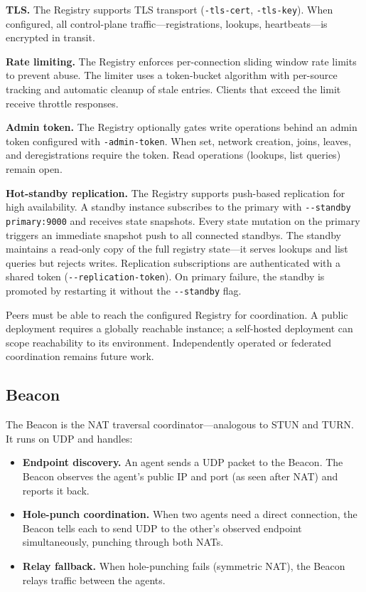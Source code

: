 \documentclass[11pt,a4paper]{article}
\begin{document}
\textbf{TLS.} The Registry supports TLS transport (\texttt{-tls-cert}, \texttt{-tls-key}). When configured, all control-plane traffic---registrations, lookups, heartbeats---is encrypted in transit.

\textbf{Rate limiting.} The Registry enforces per-connection sliding window rate limits to prevent abuse. The limiter uses a token-bucket algorithm with per-source tracking and automatic cleanup of stale entries. Clients that exceed the limit receive throttle responses.

\textbf{Admin token.} The Registry optionally gates write operations behind an admin token configured with \texttt{-admin-token}. When set, network creation, joins, leaves, and deregistrations require the token. Read operations (lookups, list queries) remain open.

\textbf{Hot-standby replication.} The Registry supports push-based replication for high availability. A standby instance subscribes to the primary with \texttt{-{}-standby primary:9000} and receives state snapshots. Every state mutation on the primary triggers an immediate snapshot push to all connected standbys. The standby maintains a read-only copy of the full registry state---it serves lookups and list queries but rejects writes. Replication subscriptions are authenticated with a shared token (\texttt{-{}-replication-token}). On primary failure, the standby is promoted by restarting it without the \texttt{-{}-standby} flag.

Peers must be able to reach the configured Registry for coordination. A public deployment requires a globally reachable instance; a self-hosted deployment can scope reachability to its environment. Independently operated or federated coordination remains future work.

\subsection{Beacon}

The Beacon is the NAT traversal coordinator---analogous to STUN and TURN. It runs on UDP and handles:

\begin{itemize}
    \item \textbf{Endpoint discovery.} An agent sends a UDP packet to the Beacon. The Beacon observes the agent's public IP and port (as seen after NAT) and reports it back.
    \item \textbf{Hole-punch coordination.} When two agents need a direct connection, the Beacon tells each to send UDP to the other's observed endpoint simultaneously, punching through both NATs.
    \item \textbf{Relay fallback.} When hole-punching fails (symmetric NAT), the Beacon relays traffic between the agents.
\end{itemize}
\end{document}
